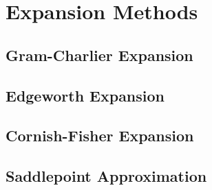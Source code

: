 \section{Expansion Methods}

\subsection{Gram-Charlier Expansion}

\subsection{Edgeworth Expansion}

\subsection{Cornish-Fisher Expansion}

\subsection{Saddlepoint Approximation}
